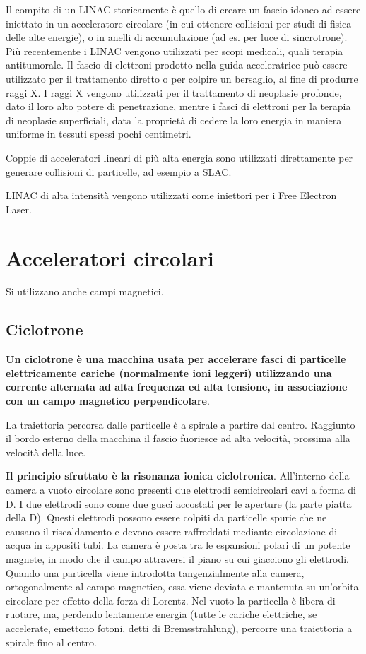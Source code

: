 \documentclass[a4paper,11pt,twoside,openany]{book}
\theoremstyle{definition}
\theoremstyle{plain}
\theoremstyle{plain}
\theoremstyle{definition}
\begin{document}
Il compito di un LINAC storicamente è quello di creare un fascio idoneo ad essere iniettato in un acceleratore circolare (in cui ottenere collisioni per studi di fisica delle alte energie), o in anelli di accumulazione (ad es. per luce di sincrotrone). Più recentemente i LINAC vengono utilizzati per scopi medicali, quali terapia antitumorale. Il fascio di elettroni prodotto nella guida acceleratrice può essere utilizzato per il trattamento diretto o per colpire un bersaglio, al fine di produrre raggi X. I raggi X vengono utilizzati per il trattamento di neoplasie profonde, dato il loro alto potere di penetrazione, mentre i fasci di elettroni per la terapia di neoplasie superficiali, data la proprietà di cedere la loro energia in maniera uniforme in tessuti spessi pochi centimetri.

Coppie di acceleratori lineari di più alta energia sono utilizzati direttamente per generare collisioni di particelle, ad esempio a SLAC.

LINAC di alta intensità vengono utilizzati come iniettori per i Free Electron Laser.

\section{Acceleratori circolari} %
Si utilizzano anche campi magnetici.

\subsection{Ciclotrone} %
\textbf{Un ciclotrone è una macchina usata per accelerare fasci di particelle elettricamente cariche (normalmente ioni leggeri) utilizzando una corrente alternata ad alta frequenza ed alta tensione, in associazione con un campo magnetico perpendicolare}.

La traiettoria percorsa dalle particelle è a spirale a partire dal centro. Raggiunto il bordo esterno della macchina il fascio fuoriesce ad alta velocità, prossima alla velocità della luce.

\textbf{Il principio sfruttato è la risonanza ionica ciclotronica}. All'interno della camera a vuoto circolare sono presenti due elettrodi semicircolari cavi a forma di D. I due elettrodi sono come due gusci accostati per le aperture (la parte piatta della D). Questi elettrodi possono essere colpiti da particelle spurie che ne causano il riscaldamento e devono essere raffreddati mediante circolazione di acqua in appositi tubi. La camera è posta tra le espansioni polari di un potente magnete, in modo che il campo attraversi il piano su cui giacciono gli elettrodi. Quando una particella viene introdotta tangenzialmente alla camera, ortogonalmente al campo magnetico, essa viene deviata e mantenuta su un'orbita circolare per effetto della forza di Lorentz. Nel vuoto la particella è libera di ruotare, ma, perdendo lentamente energia (tutte le cariche elettriche, se accelerate, emettono fotoni, detti di Bremsstrahlung), percorre una traiettoria a spirale fino al centro.
\end{document}
